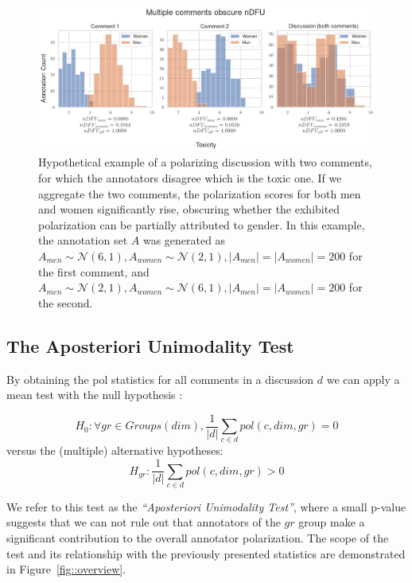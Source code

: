 \documentclass{article}
\newcommand{\sdbdim}{\textit{dim}}
\newcommand{\sdbgroup}{\textit{gr}}
\newcommand{\Sdbgroup}{\textit{Groups}}
\begin{document}
\begin{figure}
	\centering
	\includegraphics[width=\linewidth]{ndfu_multi_comments.png}
	\caption{Hypothetical example of a polarizing discussion with two comments, for which the annotators disagree which is the toxic one. If we aggregate the two comments, the polarization scores for both men and women significantly rise, obscuring whether the exhibited polarization can be partially attributed to gender. In this example, the annotation set $A$ was generated as $A_{men} \sim \mathcal{N}(6, 1), A_{women} \sim \mathcal{N}(2, 1), \lvert A_{men} \rvert = \lvert A_{women} \rvert = 200$ for the first comment, and $A_{men} \sim \mathcal{N}(2, 1), A_{women} \sim \mathcal{N}(6, 1), \lvert A_{men} \rvert = \lvert A_{women} \rvert = 200$ for the second.}
	\label{fig:ndfu_multi_comment}
\end{figure}



\subsection{The Aposteriori Unimodality Test}
\label{ssec:methodology:aposteriori}

By obtaining the pol statistics for all comments in a discussion $d$ we can apply a mean test with the null hypothesis :

\begin{equation}
	\label{eq:null_h}
	H_0: \forall \sdbgroup \in \Sdbgroup(\sdbdim), \frac{1}{\lvert d \rvert} \sum\limits_{c \in d} pol(c, \sdbdim,  \sdbgroup) = 0
\end{equation}
\noindent versus the (multiple) alternative hypotheses: 
\begin{equation}
	\label{eq:alt_h}
	H_{\sdbgroup}:\frac{1}{\lvert d \rvert} \sum\limits_{c \in d}  pol(c, \sdbdim, \sdbgroup) >  0
\end{equation}

We refer to this test as the \textit{``Aposteriori Unimodality Test''}, where a small p-value suggests that we can not rule out that annotators of the $\sdbgroup$ group make a significant contribution to the overall annotator polarization. The scope of the test and its relationship with the previously presented statistics are demonstrated in Figure~\ref{fig::overview}.
\end{document}
